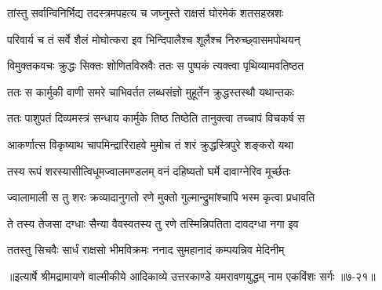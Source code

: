 \twolineshloka
{तांस्तु सर्वान्विनिर्भिद्य तदस्त्रमपहत्य च}
{जघ्नुस्ते राक्षसं घोरमेकं शतसहस्रशः} %

\twolineshloka
{परिवार्य च तं सर्वे शैलं मोघोत्करा इव}
{भिन्दिपालैश्च शूलैश्च निरुच्छ्वासमपोथयन्} %

\twolineshloka
{विमुक्तकवचः क्रुद्धः सिक्तः शोणितविस्रवैः}
{ततः स पुष्पकं त्यक्त्वा पृथिव्यामवतिष्ठत} %

\twolineshloka
{ततः स कार्मुकी वाणी समरे चाभिवर्तत}
{लब्धसंज्ञो मुहूर्तेन क्रुद्धस्तस्थौ यथान्तकः} %

\twolineshloka
{ततः पाशुपतं दिव्यमस्त्रं सन्धाय कार्मुके}
{तिष्ठ तिष्ठेति तानुक्त्वा तच्चापं विचकर्ष स} %

\twolineshloka
{आकर्णात्स विकृष्याथ चापमिन्द्रारिराहवे}
{मुमोच तं शरं क्रुद्धस्त्रिपुरे शङ्करो यथा} %

\twolineshloka
{तस्य रूपं शरस्यासीत्विधूमज्वालमण्डलम्}
{वनं दहिष्यतो घर्मे दावाग्नेरिव मूर्च्छतः} %

\twolineshloka
{ज्वालामाली स तु शरः क्रव्यादानुगतो रणे}
{मुक्तो गुल्मान्द्रुमांश्चापि भस्म कृत्वा प्रधावति} %

\twolineshloka
{ते तस्य तेजसा दग्धाः सैन्या वैवस्वतस्य तु}
{रणे तस्मिन्निपतिता दावदग्धा नगा इव} %

\twolineshloka
{ततस्तु सिचवैः सार्धं राक्षसो भीमविक्रमः}
{ननाद सुमहानादं कम्पयन्निव मेदिनीम्} %


॥इत्यार्षे श्रीमद्रामायणे वाल्मीकीये आदिकाव्ये उत्तरकाण्डे यमरावणयुद्धम् नाम एकविंशः सर्गः ॥७-२१॥
